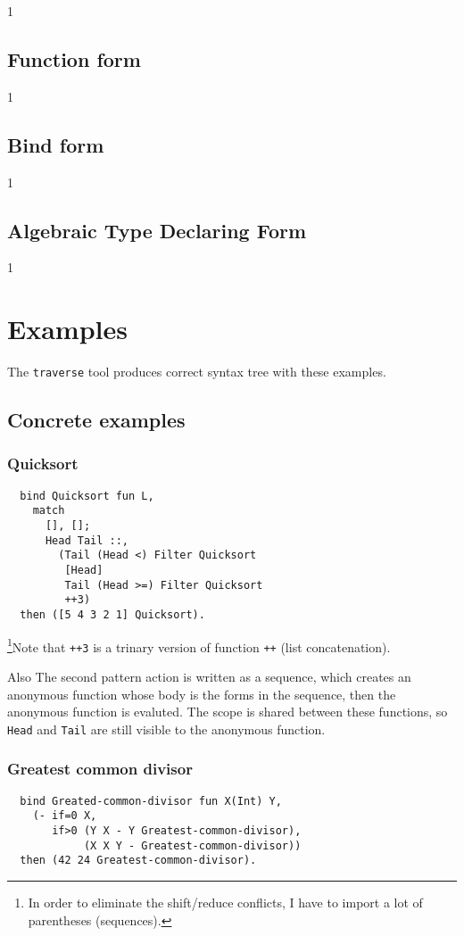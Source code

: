 \documentclass{book}
\begin{document}
1

\section{Function form}

1

\section{Bind form}

1

\section{Algebraic Type Declaring Form}

1

\chapter{Examples}
\label{chap:examples}

The \texttt{traverse} tool produces correct syntax tree with these examples.

\section{Concrete examples}
\subsection{Quicksort}
\begin{verbatim}
  bind Quicksort fun L,
    match
      [], [];
      Head Tail ::,
        (Tail (Head <) Filter Quicksort
         [Head]
         Tail (Head >=) Filter Quicksort
         ++3)
  then ([5 4 3 2 1] Quicksort).
\end{verbatim}

\footnote{In order to eliminate the shift/reduce conflicts, I have to import a lot of parentheses (sequences).}Note that \texttt{++3} is a trinary version of function \texttt{++} (list concatenation).

Also The second pattern action is written as a sequence, which creates an anonymous function whose body is the forms in the sequence, then the anonymous function is evaluted. The scope is shared between these functions, so \texttt{Head} and \texttt{Tail} are still visible to the anonymous function.

\subsection{Greatest common divisor}
\begin{verbatim}
  bind Greated-common-divisor fun X(Int) Y,
    (- if=0 X,
       if>0 (Y X - Y Greatest-common-divisor),
            (X X Y - Greatest-common-divisor))
  then (42 24 Greatest-common-divisor).
\end{verbatim}
\end{document}
